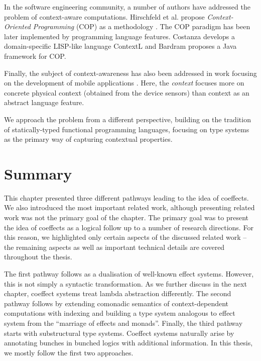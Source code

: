In the software engineering community, a number of authors have addressed the
problem of context-aware computations. Hirschfeld et al. propose \emph{Context-Oriented Programming} 
(COP) as a methodology \cite{app-cop-method}. The COP paradigm has been later implemented by
programming language features. Costanza \cite{app-cop-contextl} develops a domain-specific LISP-like 
language ContextL and Bardram \cite{app-cop-javafwk} proposes a Java framework for COP.

Finally, the subject of context-awareness has also been addressed in work focusing on the development 
of mobile applications \cite{app-cop-mobile,app-cop-mobile2}. Here, the \emph{context} focuses more 
on concrete physical context (obtained from the device sensors) than context as an abstract 
language feature.

We approach the problem from a different perspective, building on the tradition of 
statically-typed functional programming languages, focusing on type systems as the primary way
of capturing contextual properties. 


\section{Summary}

This chapter presented three different pathways leading to the idea of coeffects. We also 
introduced the most important related work, although presenting related work was not the
primary goal of the chapter. The primary goal was to present the idea of coeffects as a logical 
follow up to a number of research directions. For this reason, we highlighted only certain aspects 
of the discussed related work -- the remaining aspects as well as important technical details are
covered throughout the thesis.

The first pathway follows as a dualisation of well-known effect systems. However, this is not simply 
a syntactic transformation. As we further discuss in the next chapter, coeffect systems treat lambda 
abstraction differently. The second pathway follows by extending comonadic semantics of context-dependent 
computations with indexing and building a type system analogous to effect system from the ``marriage of 
effects and monads''. Finally, the third pathway starts with substructural type systems. Coeffect
systems naturally arise by annotating bunches in bunched logics with additional information. In this
thesis, we mostly follow the first two approaches.